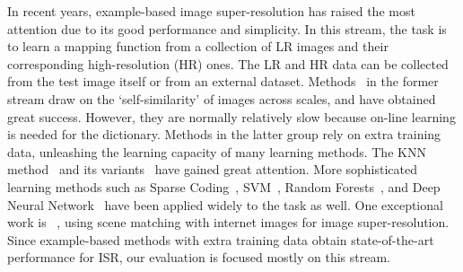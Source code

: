 In recent years, example-based image super-resolution has raised the
most attention due to its good performance and simplicity. In this
stream, the task is to learn a mapping function from a collection of
LR images and their corresponding high-resolution (HR) ones. The LR and HR data can be
collected from the test image itself or from an external dataset.
Methods~\citep{Freedman-TOG-2011, Glasner-ICCV-2009, selfsimaccv, Huang_2015_CVPR}
in the former stream draw on the `self-similarity' of images across scales,
and have obtained great success. However, they are normally relatively slow because on-line learning is needed for the dictionary. 
Methods in the latter group rely on extra training data, unleashing the learning capacity
of many learning methods. The KNN method~\citep{Freeman-CGA-2002}
and its variants~\citep{Chang-CVPR-2004, Yang-ICCV-2013, JOR:EG15, dai:MI}
have gained great attention. More sophisticated learning methods such as Sparse Coding~\citep{Yang-TIP-2010,  Kim-PAMI-2010, Timofte-ICCV-2013, Timofte-ACCV-2014,  deeply:improved},
SVM~\citep{ISR:SVM}, Random Forests~\citep{SR_forest, NBSRF, cSRF}, and Deep Neural Network~\citep{Dong-ECCV-2014, deep:cascade, deeply:improved} have been applied widely to the task as well.
One exceptional work is ~\citep{ISR:internet}, using scene matching with internet images for image super-resolution.
Since example-based methods with extra training data obtain state-of-the-art performance for ISR, our 
evaluation is focused mostly on this stream.


